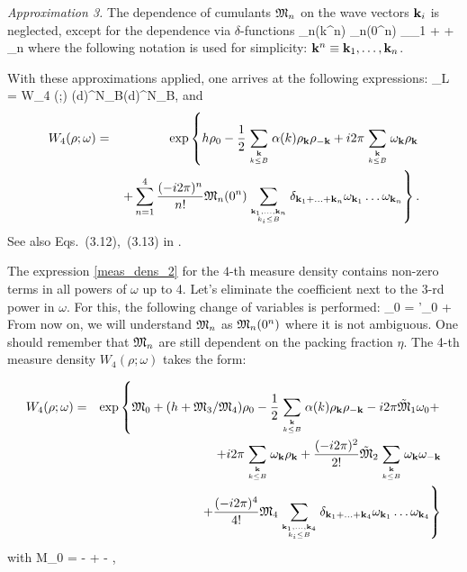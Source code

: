 {\it Approximation 3.} The dependence of cumulants $\frak M_n$ on the wave vectors $\vb k_i$ is neglected, except for the dependence via $\delta$-functions
\be
{}_n({\vb k}^n) \approx {}_n(0^n) \delta_{_1 + \dotsc + _n}
\ee
where the following notation is used for simplicity: ${\vb k}^n\equiv {\vb k}_1, \dotsc, {\vb k}_n$.

With these approximations applied, one arrives at the following expressions:
\be
\label{gpf_l4}
\Xi_L = \int W_4 (\rho;\omega) (d\rho)^{N_B}(d\omega)^{N_B}, 
\ee
and
\begin{eqnarray}
	\label{meas_dens_2}
	W_4(\rho;\omega) &=& \exp \left\{ h\rho_0
	- \frac12  \sum\limits_{{\vb k}\atop k\le B} \alpha(k) \rho_{\vb k} \rho_{-{\vb k}}
	+ i2\pi \sum\limits_{{\vb k} \atop k\le B} \omega_{\vb k} \rho_{\vb k} \right.  \nonumber\\
	&& \left.+
	\sum\limits_{n=1}^4 \frac{(-i2\pi)^n}{n!} 
	{\frak M}_n(0^n)
	\sum\limits_{\vb{k}_1,\dotsc,\vb{k}_n\atop{k_i \le B}}
	\delta_{\vb{k}_1 + \dotsc + \vb{k}_n} 
	\omega_{{\vb k}_1} \dots \omega_{{\vb k}_n} \right\}.
\end{eqnarray}
See also Eqs.~(3.12),~(3.13) in \cite{Yukh1990}.

The expression \ref{meas_dens_2} for the $4$-th measure density contains non-zero terms in all powers of $\omega$ up to 4. Let's eliminate the coefficient next to the 3-rd power in $\omega$. For this, the following change of variables is performed:
\be
\omega_0 = \omega'_0 + 
\ee
From now on, we will understand $\frak M_n$ as $\frak{M}_n(0^n)$ where it is not ambiguous. One should remember that $\frak M_n$ are still dependent on the packing fraction $\eta$.
The 4-th measure density $W_4(\rho; \omega)$ takes the form:

\begin{eqnarray}
	\label{meas_dens_3}
	W_4(\rho;\omega) &=& \exp \left\{\frak M_0 + (h + \frak M_3/\frak M_4)\rho_0
	- \frac12  \sum\limits_{{\vb k}\atop k\le B} \alpha(k) \rho_{\vb k} \rho_{-{\vb k}}
	- i2\pi \tilde{\frak M}_1 \omega_0 + \right.  \nonumber\\
	&&
	+ i2\pi \sum\limits_{{\vb k} \atop k\le B} \omega_{\vb k} \rho_{\vb k}
	+ \frac{(-i2\pi)^2}{2!}\tilde{\frak M}_2 \sum\limits_{{\vb k} \atop k\le B} \omega_{\vb k} \omega_{-\vb k}
	\nonumber\\
	&& \left. +
	\frac{(-i2\pi)^4}{4!} 
	{\frak M}_4
	\sum\limits_{\vb{k}_1,\dotsc,\vb{k}_4\atop{k_i \le B}}
	\delta_{\vb{k}_1 + \dotsc + \vb{k}_4} 
	\omega_{{\vb k}_1} \dots \omega_{{\vb k}_4} \right\}
\end{eqnarray}
with
\be
\frak M_0 = - + 
- ,
\ee

